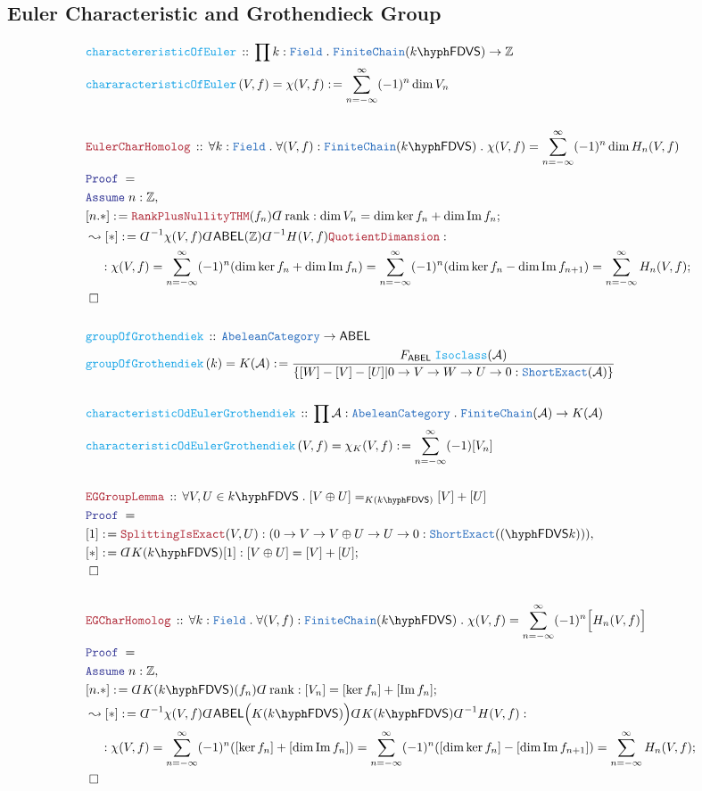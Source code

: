\documentclass[12pt]{scrartcl}%
\newcommand{\TYPE}[1]{\textcolor{NavyBlue}{\mathtt{#1}}}%
\newcommand{\FUNC}[1]{\textcolor{Cerulean}{\mathtt{#1}}}%
\newcommand{\LOGIC}[1]{\textcolor{Blue}{\mathtt{#1}}}%
\newcommand{\THM}[1]{\textcolor{Maroon}{\mathtt{#1}}}%
\renewcommand{\.}{\; . \;} %
\newcommand{\de}{: \kern 0.1pc =} %
\newcommand{\Act}[1]{\left( #1 \right)} %
\newcommand{\Theorem}[2]{& \THM{#1} \, :: \, #2 \\ & \Proof = \\ } %
\newcommand{\DeclareFunc}[2]{& \FUNC{#1} \, :: \, #2 \\}%
\newcommand{\DefineNamedFunc}[4]{&  \FUNC{#1}\Act{#2} = #3 \de #4 \\}%
\newcommand{\NewLine}{\\ & \kern 1pc}%
\newcommand{\Page}[1]{ \begin{align*} #1 \end{align*}  }%
\newcommand{ \bd }{ \ByDef }%
\newcommand{\Int}{\mathbb{Z}}%
\DeclareMathOperator*{\im}{Im}%
\newcommand{\Say}[3]{& #1 \de #2 : #3, \\} %
\newcommand{\Conclude}[3]{& #1 \de #2 : #3; \\}%
\newcommand{\DeriveConclude}[3]{& \leadsto #1 \de #2 : #3 ; \\} %
\newcommand{\Assume}[2]{& \LOGIC{Assume} \; #1 : #2, \\} %
\newcommand{\QED}{\; \square} %
\newcommand{\EndProof}{& \QED \\} %
\newcommand{\ByDef}{\rotatebox[origin=c]{-180}{$D$}}%
\newcommand{\Proof}{\LOGIC{Proof} \; } %
\newcommand{\A}{\mathcal{A}}
\DeclareMathOperator{\rank}{rank} %
\newcommand{\ABEL}{\mathsf{ABEL}} %
\newcommand{\FDVS}[1]{#1\hyph\mathsf{FDVS}} %
\newcommand{\Field}{\TYPE{Field}}
\begin{document}
\subsection{Euler Characteristic and Grothendieck Group}
\Page{
	\DeclareFunc{charactereristicOfEuler}{\prod k : \Field \. \TYPE{FiniteChain}(\FDVS{k}) \to \Int  }
	\DefineNamedFunc{chararacteristicOfEuler}{V,f}{\chi(V,f)}{ \sum^\infty_{n = - \infty} (-1)^n \dim V_n  }
	\\
	\Theorem{EulerCharHomolog}{\forall k : \Field \. \forall (V,f) : \TYPE{FiniteChain}(\FDVS{k}) \. \chi(V,f) = \sum^\infty_{n=-\infty} (-1)^n \dim H_n(V,f)}
	\Assume{n}{\Int}
	\Conclude{[n.*]}{\THM{RankPlusNullityTHM}(f_n)\bd \rank}{ \dim V_n =  \dim \ker f_n  + \dim \im f_n}
	\DeriveConclude{[*]}{\bd^{-1} \chi(V,f) \bd \ABEL(\Int) \bd^{-1} H(V,f) \THM{QuotientDimansion} }{
		\NewLine :
		\chi(V,f) = 
		\sum^\infty_{n= - \infty} (-1)^n (\dim \ker f_n + \dim \im f_n) = 
		\sum^\infty_{n=-\infty}  (-1)^n( \dim \ker f_n - \dim \im f_{n+1}) = 
		\sum^\infty_{n=-\infty} H_n(V,f)
	}
	\EndProof
	\\
	\DeclareFunc{groupOfGrothendiek}{\TYPE{AbeleanCategory} \to \ABEL}
	\DefineNamedFunc{groupOfGrothendiek}{k}{ K(\A)}{ \frac{F_{\ABEL}\; \FUNC{Isoclass}(\A)}{\{  [W] - [V] - [U] | 0 \to V \to W  \to U \to 0 : \TYPE{ShortExact}(\A) \}}    }
	\\
	\DeclareFunc{characteristicOdEulerGrothendiek}{\prod \A : \TYPE{AbeleanCategory} \. \TYPE{FiniteChain}(\A) \to K(\A)}
	\DefineNamedFunc{characteristicOdEulerGrothendiek}{V,f}{\chi_K(V,f)}{\sum^\infty_{n=-\infty} (-1) [V_n]}
	\\
	\Theorem{EGGroupLemma}{ \forall V,U \in \FDVS{k} \. [V \oplus U] =_{K(\FDVS{k})} [V] + [U] }
	\Say{[1]}{\THM{SplittingIsExact}(V,U)}{(0 \to V \to V \oplus U \to U \to 0 : \TYPE{ShortExact}(\FDVS(k)))}
	\Conclude{[*]}{\bd K(\FDVS{k})[1]}{ [V \oplus U]= [V] + [U]}
	\EndProof
	\\
	\Theorem{EGCharHomolog}{\forall k : \Field \. \forall (V,f) : \TYPE{FiniteChain}(\FDVS{k}) \. \chi(V,f) = \sum^\infty_{n=-\infty} (-1)^n \Big[H_n(V,f)\Big]}
	\Assume{n}{\Int}
	\Conclude{[n.*]}{\bd K(\FDVS{k})(f_n)\bd \rank}{ [V_n] =  [\ker f_n] + [\im f_n]}
	\DeriveConclude{[*]}{\bd^{-1} \chi(V,f) \bd \ABEL\Big(K(\FDVS{k})\Big) \bd K(\FDVS{k})\bd^{-1} H(V,f)  }{
		\NewLine :
		\chi(V,f) = 
		\sum^\infty_{n= - \infty} (-1)^n ( [\ker f_n] + [\dim \im f_n]) = 
		\sum^\infty_{n=-\infty}  (-1)^n( [\dim \ker f_n] - [\dim \im f_{n+1}]) = 
		\sum^\infty_{n=-\infty} H_n(V,f)
	}
	\EndProof
}
\end{document}
